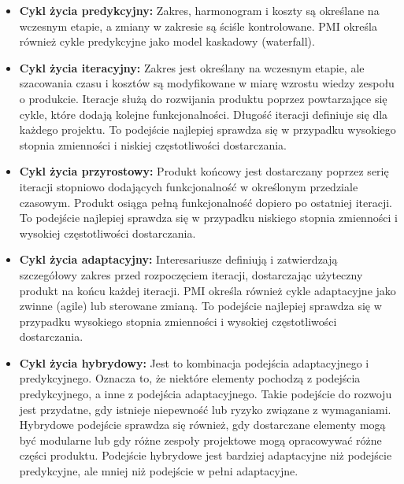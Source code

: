 \begin{itemize}
    \item \textbf{Cykl życia predykcyjny:} Zakres, harmonogram i koszty są określane na wczesnym etapie, a zmiany w zakresie są ściśle kontrolowane. PMI określa również cykle predykcyjne jako model kaskadowy (waterfall). \autocite{pmbok}\autocite{ITPM}
    
    \item \textbf{Cykl życia iteracyjny:} Zakres jest określany na wczesnym etapie, ale szacowania czasu i kosztów są modyfikowane w miarę wzrostu wiedzy zespołu o produkcie. Iteracje służą do rozwijania produktu poprzez powtarzające się cykle, które dodają kolejne funkcjonalności. \autocite{sommerville2015software}\autocite{farley2021}\autocite{pmbok6} Długość iteracji definiuje się dla każdego projektu. \autocite{swebok} To podejście najlepiej sprawdza się w przypadku wysokiego stopnia zmienności i niskiej częstotliwości dostarczania. \autocite{ITPM}
    
    \item \textbf{Cykl życia przyrostowy:} Produkt końcowy jest dostarczany poprzez serię iteracji stopniowo dodających funkcjonalność w określonym przedziale czasowym. Produkt osiąga pełną funkcjonalność dopiero po ostatniej iteracji. \autocite{sommerville2015software}\autocite{farley2021}\autocite{pmbok6} To podejście najlepiej sprawdza się w przypadku niskiego stopnia zmienności i wysokiej częstotliwości dostarczania. \autocite{ITPM}
    
    \item \textbf{Cykl życia adaptacyjny:} Interesariusze definiują i zatwierdzają szczegółowy zakres przed rozpoczęciem iteracji, dostarczając użyteczny produkt na końcu każdej iteracji. PMI określa również cykle adaptacyjne jako zwinne (agile) lub sterowane zmianą. To podejście najlepiej sprawdza się w przypadku wysokiego stopnia zmienności i wysokiej częstotliwości dostarczania. \autocite{pmbok6}\autocite{ITPM}
    
    \item \textbf{Cykl życia hybrydowy:} Jest to kombinacja podejścia adaptacyjnego i predykcyjnego. Oznacza to, że niektóre elementy pochodzą z podejścia predykcyjnego, a inne z podejścia adaptacyjnego. Takie podejście do rozwoju jest przydatne, gdy istnieje niepewność lub ryzyko związane z wymaganiami. Hybrydowe podejście sprawdza się również, gdy dostarczane elementy mogą być modularne lub gdy różne zespoły projektowe mogą opracowywać różne części produktu. Podejście hybrydowe jest bardziej adaptacyjne niż podejście predykcyjne, ale mniej niż podejście w pełni adaptacyjne. \autocite{pmbok7}
\end{itemize}

